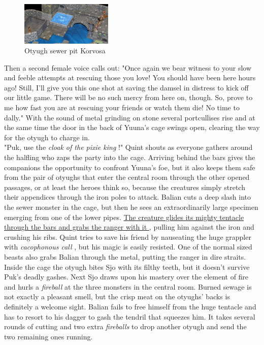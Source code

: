 \begin{figure}[h]
	\centering
	\includegraphics[width=0.39\textwidth]{images/Otyugh-sewer-pit-Korvosa-550449437.jpg}
	\caption{Otyugh sewer pit Korvosa}
	\label{fig:Otyugh-sewer-pit-Korvosa-550449437}
\end{figure}

Then a second female voice calls out: "Once again we bear witness to your slow and feeble attempts at rescuing those you love! You should have been here hours ago! Still, I'll give you this one shot at saving the damsel in distress to kick off our little game. There will be no such mercy from here on, though. So, prove to me how fast you are at rescuing your friends or watch them die! No time to dally." With the sound of metal grinding on stone several portcullises rise and at the same time the door in the back of Yuuna's cage swings open, clearing the way for the otyugh to charge in.\\

"Puk, use the {\itshape cloak of the pixie king} !" Quint shouts as everyone gathers around the halfling who zaps the party into the cage. Arriving behind the bars gives the companions the opportunity to confront Yuuna's foe, but it also keeps them safe from the pair of otyughs that enter the central room through the other opened passages, or at least the heroes think so, because the creatures simply stretch their appendices through the iron poles to attack. Balian cuts a deep slash into the sewer monster in the cage, but then he sees an extraordinarily large specimen emerging from one of the lower pipes. \hyperref[fig:Otyugh-attack-in-Old-Korvosa-550450012]{ The creature glides its mighty tentacle through the bars and grabs the ranger with it } , pulling him against the iron and crushing his ribs. Quint tries to save his friend by nauseating the huge grappler with  {\itshape cacophonous call} , but his magic is easily resisted. One of the normal sized beasts also grabs Balian through the metal, putting the ranger in dire straits. Inside the cage the otyugh bites Sjo with its filthy teeth, but it doesn't survive Puk's deadly gashes. Next Sjo draws upon his mastery over the element of fire and hurls a  {\itshape fireball} at the three monsters in the central room. Burned sewage is not exactly a pleasant smell, but the crisp meat on the otyughs' backs is definitely a welcome sight. Balian fails to free himself from the huge tentacle and has to resort to his dagger to gash the tendril that squeezes him. It takes several rounds of cutting and two extra  {\itshape fireballs} to drop another otyugh and send the two remaining ones running. \\

